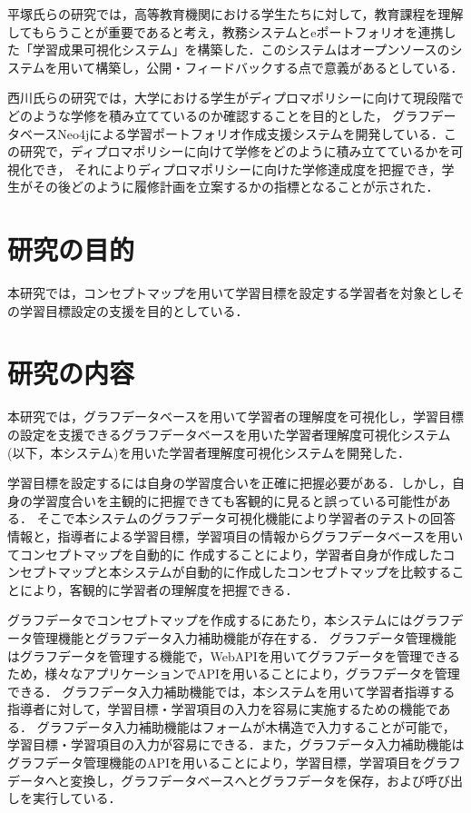 平塚氏らの研究では，高等教育機関における学生たちに対して，教育課程を理解してもらうことが重要であると考え，教務システムとeポートフォリオを連携した「学習成果可視化システム」を構築した．このシステムはオープンソースのシステムを用いて構築し，公開・フィードバックする点で意義があるとしている\cite{hira}．

西川氏らの研究では，大学における学生がディプロマポリシーに向けて現段階でどのような学修を積み立てているのか確認することを目的とした，
グラフデータベースNeo4jによる学習ポートフォリオ作成支援システムを開発している\cite{nisi}．この研究で，ディプロマポリシーに向けて学修をどのように積み立てているかを可視化でき，
それによりディプロマポリシーに向けた学修達成度を把握でき，学生がその後どのように履修計画を立案するかの指標となることが示された．

\section{研究の目的}
本研究では，コンセプトマップを用いて学習目標を設定する学習者を対象としその学習目標設定の支援を目的としている．

\section{研究の内容}
本研究では，グラフデータベースを用いて学習者の理解度を可視化し，学習目標の設定を支援できるグラフデータベースを用いた学習者理解度可視化システム(以下，本システム)を用いた学習者理解度可視化システムを開発した．

学習目標を設定するには自身の学習度合いを正確に把握必要がある．しかし，自身の学習度合いを主観的に把握できても客観的に見ると誤っている可能性がある．
そこで本システムのグラフデータ可視化機能により学習者のテストの回答情報と，指導者による学習目標，学習項目の情報からグラフデータベースを用いてコンセプトマップを自動的に
作成することにより，学習者自身が作成したコンセプトマップと本システムが自動的に作成したコンセプトマップを比較することにより，客観的に学習者の理解度を把握できる．

グラフデータでコンセプトマップを作成するにあたり，本システムにはグラフデータ管理機能とグラフデータ入力補助機能が存在する．
グラフデータ管理機能はグラフデータを管理する機能で，WebAPIを用いてグラフデータを管理できるため，様々なアプリケーションでAPIを用いることにより，グラフデータを管理できる．
グラフデータ入力補助機能では，本システムを用いて学習者指導する指導者に対して，学習目標・学習項目の入力を容易に実施するための機能である．
グラフデータ入力補助機能はフォームが木構造で入力することが可能で，学習目標・学習項目の入力が容易にできる．また，グラフデータ入力補助機能はグラフデータ管理機能のAPIを用いることにより，学習目標，学習項目をグラフデータへと変換し，グラフデータベースへとグラフデータを保存，および呼び出しを実行している．



